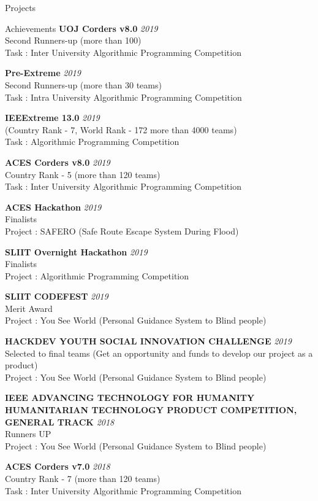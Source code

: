 \documentclass{resume} %
\begin{document}
\begin{rSection}{Projects}
\begin{rSection}{Achievements}
{\bf UOJ Corders v8.0 } \hfill {\em 2019}
\\Second Runners-up (more than 100)
\\Task : Inter University Algorithmic Programming Competition

{\bf Pre-Extreme } \hfill {\em 2019}
\\Second Runners-up (more than 30 teams)
\\Task : Intra University Algorithmic Programming Competition

{\bf IEEExtreme 13.0} \hfill {\em 2019}
\\ (Country Rank - 7, World Rank - 172 more than 4000 teams)
\\Task : Algorithmic Programming Competition

{\bf ACES Corders v8.0 } \hfill {\em 2019}
\\Country Rank - 5 (more than 120 teams)
\\Task : Inter University Algorithmic Programming Competition

{\bf ACES Hackathon } \hfill {\em 2019}
\\Finalists
\\Project : SAFERO (Safe Route Escape System During Flood)

{\bf SLIIT Overnight Hackathon } \hfill {\em 2019}
\\Finalists
\\Project : Algorithmic Programming Competition

{\bf SLIIT CODEFEST } \hfill {\em 2019}
\\Merit Award
\\Project : You See World (Personal Guidance System to Blind people)

{\bf HACKDEV YOUTH SOCIAL INNOVATION CHALLENGE } \hfill {\em 2019}
\\Selected to final teams (Get an opportunity and funds to develop our project as a product)
\\Project : You See World (Personal Guidance System to Blind people)

{\bf IEEE ADVANCING TECHNOLOGY FOR HUMANITY HUMANITARIAN TECHNOLOGY PRODUCT COMPETITION, GENERAL TRACK } \hfill {\em 2018}
\\Runners UP
\\Project : You See World (Personal Guidance System to Blind people)

{\bf ACES Corders v7.0 } \hfill {\em 2018}
\\Country Rank - 7 (more than 120 teams)
\\Task : Inter University Algorithmic Programming Competition


\end{rSection}
\end{rSection}
\end{document}
